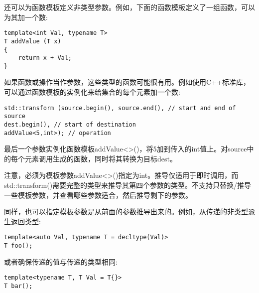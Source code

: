 还可以为函数模板定义非类型参数。例如，下面的函数模板定义了一组函数，可以为其加一个数:

\begin{lstlisting}[style=styleCXX]
template<int Val, typename T>
T addValue (T x)
{
	return x + Val;
}
\end{lstlisting}

如果函数或操作当作参数，这些类型的函数可能很有用。例如使用C++标准库，可以通过函数模板的实例化来给集合的每个元素加一个数:

\begin{lstlisting}[style=styleCXX]
std::transform (source.begin(), source.end(), // start and end of source
dest.begin(), // start of destination
addValue<5,int>); // operation
\end{lstlisting}

最后一个参数实例化函数模板addValue<>()，将5加到传入的int值上。对source中的每个元素调用生成的函数，同时将其转换为目标dest。

注意，必须为模板参数addValue<>()指定为int。推导仅适用于即时调用，而std::transform()需要完整的类型来推导其第四个参数的类型。不支持只替换/推导一些模板参数，并查看哪些参数适合，然后推导剩下的参数。

同样，也可以指定模板参数是从前面的参数推导出来的。例如，从传递的非类型派生返回类型:

\begin{lstlisting}[style=styleCXX]
template<auto Val, typename T = decltype(Val)>
T foo();
\end{lstlisting}

或者确保传递的值与传递的类型相同:

\begin{lstlisting}[style=styleCXX]
template<typename T, T Val = T{}>
T bar();
\end{lstlisting}































